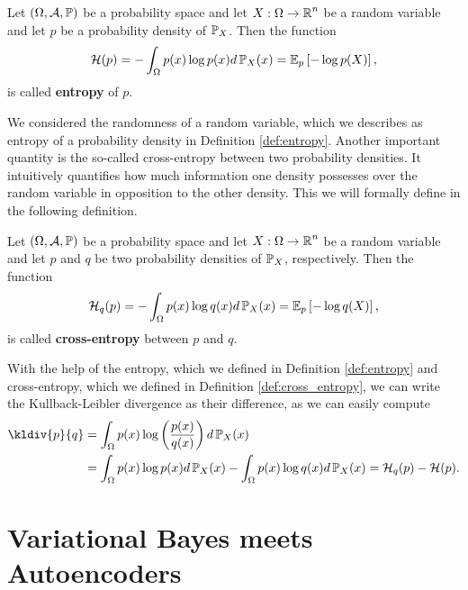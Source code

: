 \begin{definition}\label{def:entropy}
Let $(\Omega,\operatorname{\mathcal{A}}, \operatorname{\mathbb{P}})$ be a probability space and let $X:\Omega \to \operatorname{\mathbb{R}}^n$ be a random variable and let $p$ be a probability density of $\operatorname{\mathbb{P}}_X$. Then the function
\begin{align}
\mathcal{H}(p) = -\int_{\Omega} p(x) \log p(x)d\operatorname{\mathbb{P}}_X(x) = \operatorname{\mathbb{E}}_p \left[ - \log p(X) \right],
\end{align}
is called \textbf{entropy} of $p$.
\end{definition}

We considered the \glqq randomness\grqq{} of a random variable, which we describes as entropy of a probability density in Definition \ref{def:entropy}. Another important quantity is the so-called cross-entropy between two probability densities. It intuitively quantifies how much information one density possesses over the random variable in opposition to the other density. This we will formally define in the following definition.

\begin{definition}\label{def:cross_entropy}
Let $(\Omega,\operatorname{\mathcal{A}}, \operatorname{\mathbb{P}})$ be a probability space and let $X:\Omega \to \operatorname{\mathbb{R}}^n$ be a random variable and let $p$ and $q$ be two probability densities of $\operatorname{\mathbb{P}}_X$, respectively. Then the function
\begin{align}
\mathcal{H}_q(p) = -\int_{\Omega} p(x) \log q(x)d\operatorname{\mathbb{P}}_X(x) = \operatorname{\mathbb{E}}_p \left[ - \log q(X) \right],
\end{align}
is called \textbf{cross-entropy} between $p$ and $q$.
\end{definition}

With the help of the entropy, which we defined in Definition \ref{def:entropy} and cross-entropy, which we defined in Definition \ref{def:cross_entropy}, we can write the Kullback-Leibler divergence as their difference, as we can easily compute
\begin{align}\label{eq:kl_entropy}
\kldiv{p}{q} &= \int_\O p(x) \log \left( \frac{p(x)}{q(x)}\right) d\prob_X(x)\nonumber\\
 &=\int_\O p(x) \log p(x) d\prob_X(x) - \int_\O p(x) \log  q(x) d\prob_X(x) = \H_q(p) - \H(p).
\end{align}


\section{Variational Bayes meets Autoencoders}\label{sec:vi_on_ae}

